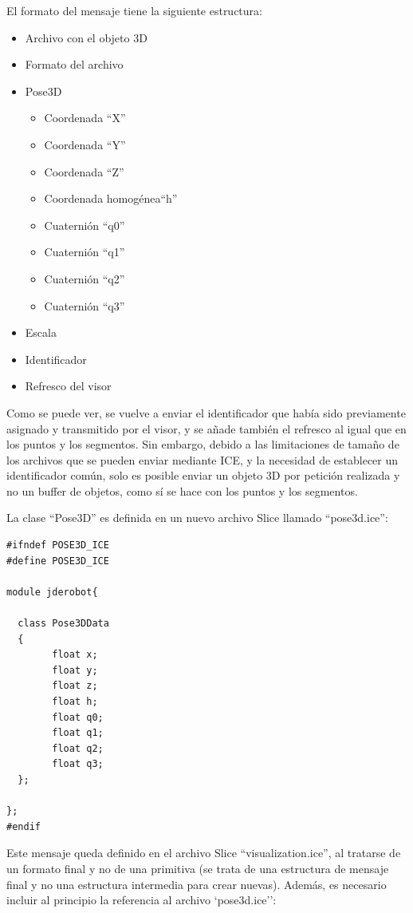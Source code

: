 El formato del mensaje tiene la siguiente estructura:
\begin{itemize}
	\item Archivo con el objeto 3D
	\item Formato del archivo
	\item	Pose3D
	\begin{itemize}
		\item Coordenada ``X''
		\item Coordenada ``Y''
		\item Coordenada ``Z''
		\item Coordenada homogénea``h''
		\item Cuaternión ``q0''
		\item Cuaternión ``q1''
		\item Cuaternión ``q2''
		\item Cuaternión ``q3''
	\end{itemize}
	\item Escala
	\item Identificador
	\item Refresco del visor
\end{itemize}
Como se puede ver, se vuelve a enviar el identificador que había sido previamente asignado y transmitido por el visor, y se añade también el refresco al igual que en los puntos y los segmentos. Sin embargo, debido a las limitaciones de tamaño de los archivos que se pueden enviar mediante ICE, y la necesidad de establecer un identificador común, solo es posible enviar un objeto 3D por petición realizada y no un buffer de objetos, como sí se hace con los puntos y los segmentos.

La clase ``Pose3D'' es definida en un nuevo archivo Slice llamado ``pose3d.ice'':

\begin{lstlisting}[caption= Definición de la clase Pose3D con Slice, label=cod.pose3dslice]
#ifndef POSE3D_ICE
#define POSE3D_ICE

module jderobot{

  class Pose3DData
  {
		float x;
		float y;
		float z;
  		float h;
		float q0;
		float q1;
		float q2;
		float q3;
  };

}; 
#endif
\end{lstlisting}

Este mensaje queda definido en el archivo Slice ``visualization.ice'', al tratarse de un formato final y no de una primitiva (se trata de una estructura de mensaje final y no una estructura intermedia para crear nuevas). Además, es necesario incluir al principio la referencia al archivo `pose3d.ice'':

